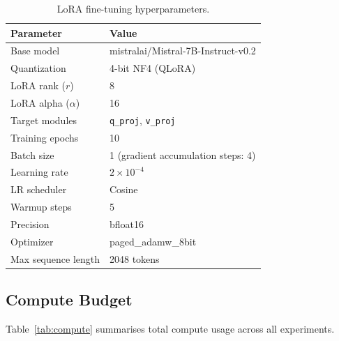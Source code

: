 \documentclass[preprint,12pt]{elsarticle}
\begin{document}
\begin{table}[h]
\centering
\caption{LoRA fine-tuning hyperparameters.}
\label{tab:ft_config}
\begin{tabular}{ll}
\toprule
Parameter & Value \\
\midrule
Base model              & mistralai/Mistral-7B-Instruct-v0.2 \\
Quantization            & 4-bit NF4 (QLoRA) \\
LoRA rank ($r$)         & 8 \\
LoRA alpha ($\alpha$)   & 16 \\
Target modules          & \texttt{q\_proj}, \texttt{v\_proj} \\
Training epochs         & 10 \\
Batch size              & 1 (gradient accumulation steps: 4) \\
Learning rate           & $2 \times 10^{-4}$ \\
LR scheduler            & Cosine \\
Warmup steps            & 5 \\
Precision               & bfloat16 \\
Optimizer               & paged\_adamw\_8bit \\
Max sequence length     & 2048 tokens \\
\bottomrule
\end{tabular}
\end{table}

\subsection{Compute Budget}

Table~\ref{tab:compute} summarises total compute usage across all experiments.
\end{document}
